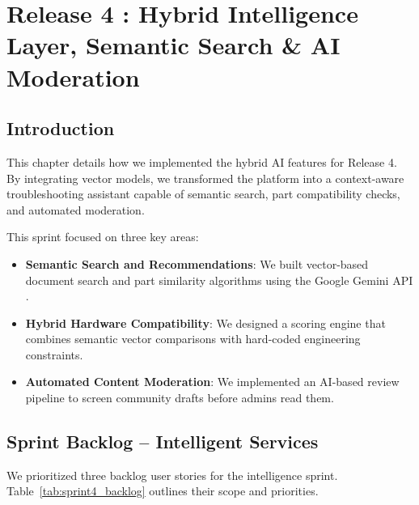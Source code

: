 \documentclass[12pt,a4paper]{report}
\begin{document}
\chapter{Release 4 : Hybrid Intelligence Layer, Semantic Search \& AI Moderation}

\section{Introduction}

This chapter details how we implemented the hybrid AI features for Release 4. By integrating vector models, we transformed the platform into a context-aware troubleshooting assistant capable of semantic search, part compatibility checks, and automated moderation.

This sprint focused on three key areas:
\begin{itemize}
    \item \textbf{Semantic Search and Recommendations}: We built vector-based document search and part similarity algorithms using the Google Gemini API \cite{gemini}.
    \item \textbf{Hybrid Hardware Compatibility}: We designed a scoring engine that combines semantic vector comparisons with hard-coded engineering constraints.
    \item \textbf{Automated Content Moderation}: We implemented an AI-based review pipeline to screen community drafts before admins read them.
\end{itemize}

\section{Sprint Backlog -- Intelligent Services}

We prioritized three backlog user stories for the intelligence sprint. Table~\ref{tab:sprint4_backlog} outlines their scope and priorities.

\renewcommand{\arraystretch}{1.3}
\setlength{\tabcolsep}{8pt}

\begin{table}[!htbp]
\centering
\caption{User stories for Release 4 (Intelligent Services)}
\label{tab:sprint4_backlog}
\end{table}
\end{document}
